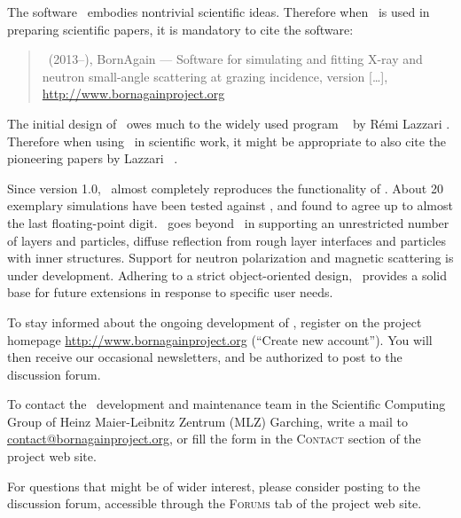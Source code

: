 The software \BornAgain\ embodies nontrivial scientific ideas.
Therefore when \BornAgain\ is used in preparing scientific papers,
it is mandatory to cite the software:
%
\begin{quote}
\authors\ (2013--\the\year),\newline
BornAgain --- Software for simulating and fitting
X-ray and neutron small-angle scattering at grazing incidence,
version [\ldots],\newline
\url{http://www.bornagainproject.org}
\end{quote}
The initial design of \BornAgain\ owes much
to the widely used program \IsGISAXS\
%
%
by R\'emi Lazzari \cite{Laz02,Laz08}.
Therefore when using \BornAgain\ in scientific work,
it might be appropriate to also cite the pioneering papers
by Lazzari \etal\ \cite{Laz02,ReLL09}.

Since version 1.0, \BornAgain\
almost completely reproduces the functionality
of \IsGISAXS.
About 20 exemplary simulations have been tested against \IsGISAXS,
and found to agree up to almost the last floating-point digit.
\BornAgain\ goes beyond \IsGISAXS\
in supporting an unrestricted number of layers and particles,
diffuse reflection from rough layer interfaces and
particles with inner structures.
Support for neutron polarization and magnetic scattering
is under development.
Adhering to a strict object-oriented design,
\BornAgain\ provides a solid base for future extensions
in response to specific user needs.

\label{Snews}

\index{Registration}
\index{Newsletter}
To stay informed about the ongoing development of \BornAgain,
register on the project homepage \url{http://www.bornagainproject.org}
(``Create new account'').
You will then receive our occasional newsletters,
and be authorized to post to the discussion forum.

\index{Contact}
To contact the \BornAgain\ development and maintenance team
in the Scientific Computing Group
of Heinz Maier-Leibnitz Zentrum (MLZ) Garching,
write a mail to \url{contact@bornagainproject.org},
or fill the form in the \textsc{Contact} section of the
project web site.

\index{Forum}
For questions that might be of wider interest,
please consider posting to the discussion forum,
accessible through the \textsc{Forums} tab of the project web site.

